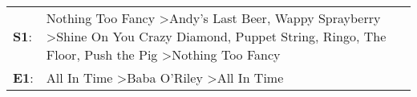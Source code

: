 \begin{supertabular}{p{0.03\textwidth}p{0.92\textwidth}}
 \textbf{S1}:  &  Nothing Too Fancy\textsuperscript{} \textgreater \enspace Andy's Last Beer\textsuperscript{}, \enspace Wappy Sprayberry\textsuperscript{} \textgreater \enspace Shine On You Crazy Diamond\textsuperscript{}, \enspace Puppet String\textsuperscript{}, \enspace Ringo\textsuperscript{}, \enspace The Floor\textsuperscript{}, \enspace Push the Pig\textsuperscript{} \textgreater \enspace Nothing Too Fancy\textsuperscript{}  \enspace  \\
 \textbf{E1}:  &                                                                                                                                                                                                                                                                                             All In Time\textsuperscript{} \textgreater \enspace Baba O'Riley\textsuperscript{} \textgreater \enspace All In Time\textsuperscript{}  \enspace  \\
\end{supertabular}
